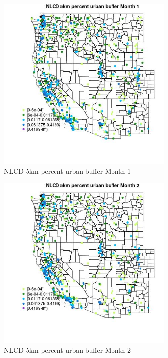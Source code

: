 \begin{figure} 
\centering  
\includegraphics[width=0.77\textwidth]{Code_Outputs/Report_ML_input_PM25_Step4_part_e_de_duplicated_aves_compiled_2019-05-18wNAs_MapObsMo1NLCD_5km_percent_urban_buffer.jpg} 
\caption{\label{fig:Report_ML_input_PM25_Step4_part_e_de_duplicated_aves_compiled_2019-05-18wNAsMapObsMo1NLCD_5km_percent_urban_buffer}NLCD 5km percent urban buffer Month 1} 
\end{figure} 
 

\begin{figure} 
\centering  
\includegraphics[width=0.77\textwidth]{Code_Outputs/Report_ML_input_PM25_Step4_part_e_de_duplicated_aves_compiled_2019-05-18wNAs_MapObsMo2NLCD_5km_percent_urban_buffer.jpg} 
\caption{\label{fig:Report_ML_input_PM25_Step4_part_e_de_duplicated_aves_compiled_2019-05-18wNAsMapObsMo2NLCD_5km_percent_urban_buffer}NLCD 5km percent urban buffer Month 2} 
\end{figure} 
 

